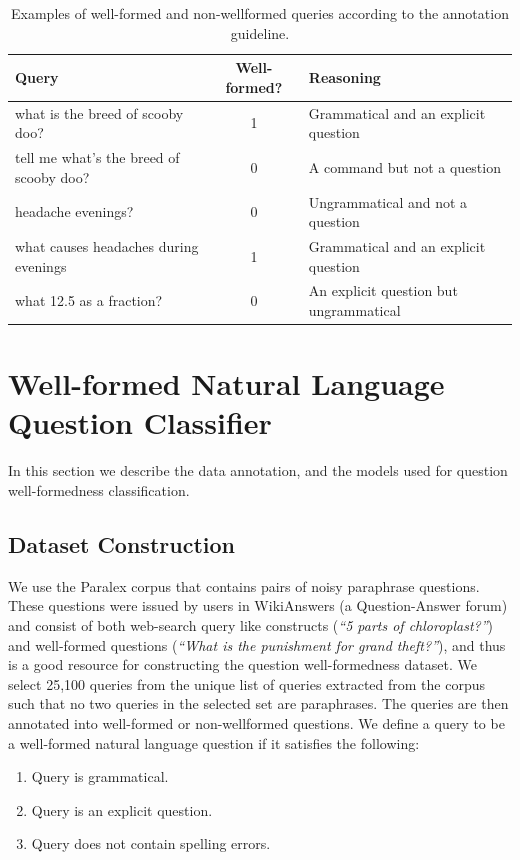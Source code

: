 \documentclass[11pt,a4paper]{article}
\begin{document}
\begin{table}[!th]
  \centering
  \begin{tabular}{|lcl|}
  \hline
    Query & Well-formed? & Reasoning\\
  \hline
  what is the breed of scooby doo? & 1 & Grammatical and an explicit question \\
  tell me what’s the breed of scooby doo? & 0 & A command but not a question \\
  headache evenings? & 0 & Ungrammatical and not a question \\
  what causes headaches during evenings & 1 & Grammatical and an explicit question \\
  what 12.5 as a fraction? & 0 & An explicit question but ungrammatical \\
  \hline
  \end{tabular}
  \caption{Examples of well-formed and non-wellformed queries according to
  the annotation guideline.}
  \label{tab:anno}
\end{table}

\section{Well-formed Natural Language Question Classifier}
\label{sec:classifier}

In this section we describe the data annotation, and the models used for
question well-formedness classification.

\subsection{Dataset Construction}
\label{sec:data}
We use the Paralex corpus \cite{paralex} that contains pairs of noisy paraphrase questions. These questions were issued by users in WikiAnswers (a Question-Answer forum) and consist of both web-search query like constructs (\textit{``5 parts of chloroplast?''}) and well-formed questions (\textit{``What is the punishment for grand theft?''}), and thus is a good resource for constructing the question well-formedness dataset.
We select 25,100 queries from the unique list of queries extracted from the corpus such
that no two queries in the selected set are paraphrases. The
queries are then annotated into well-formed or non-wellformed questions.
We define a query to be a well-formed natural language question if it satisfies
the following:
\begin{enumerate}
  \itemsep-0.3em
  \item Query is grammatical.
  \item Query is an explicit question.
  \item Query does not contain spelling errors.
\end{enumerate}
\end{document}
